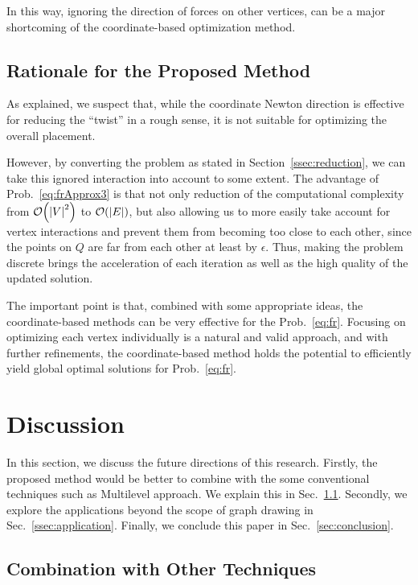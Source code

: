 \documentclass[dvipdfmx,10pt,journal,compsoc]{IEEEtran}
\begin{document}
In this way, ignoring the direction of forces on other vertices, can be a major shortcoming of the coordinate-based optimization method.

\subsection{Rationale for the Proposed Method}\label{ssec:rationale}

As explained, we suspect that, while the coordinate Newton direction is effective for reducing the ``twist'' in a rough sense, it is not suitable for optimizing the overall placement.

However, by converting the problem as stated in Section~\ref{ssec:reduction}, we can take this ignored interaction into account to some extent.
The advantage of Prob.~\eqref{eq:frApprox3} is that not only reduction of the computational complexity from $\order{\abs{V}^2}$ to $\order{\abs{E}}$, but also allowing us to more easily take account for vertex interactions and prevent them from becoming too close to each other, since the points on $Q$ are far from each other at least by $\epsilon$.
Thus, making the problem discrete brings the acceleration of each iteration as well as the high quality of the updated solution.

The important point is that, combined with some appropriate ideas, the coordinate-based methods can be very effective for the Prob.~\eqref{eq:fr}.
Focusing on optimizing each vertex individually is a natural and valid approach, and with further refinements, the coordinate-based method holds the potential to efficiently yield global optimal solutions for Prob.~\eqref{eq:fr}.

\section{Discussion} \label{sec:discussion}

In this section, we discuss the future directions of this research.
Firstly, the proposed method would be better to combine with the some conventional techniques such as Multilevel approach. We explain this in Sec.~\ref{sec:combination}.
Secondly, we explore the applications beyond the scope of graph drawing in Sec.~\ref{ssec:application}.
Finally, we conclude this paper in Sec.~\ref{sec:conclusion}.

\subsection{Combination with Other Techniques}\label{sec:combination}
\end{document}
